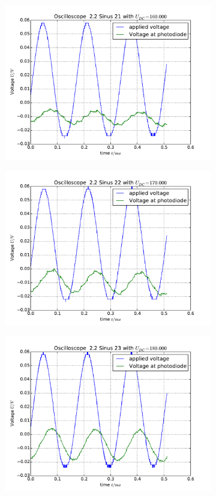 \begin{figure}
\begin{subfigure}[b]{\picwidth}
        \includegraphics[width=\textwidth]{analysis/figures/22sinus21}
        \caption{}
    \end{subfigure}
    \begin{subfigure}[b]{\picwidth}
        \includegraphics[width=\textwidth]{analysis/figures/22sinus22}
        \caption{}
    \end{subfigure}
    \begin{subfigure}[b]{\picwidth}
        \includegraphics[width=\textwidth]{analysis/figures/22sinus23}

\end{subfigure}
\end{figure}
